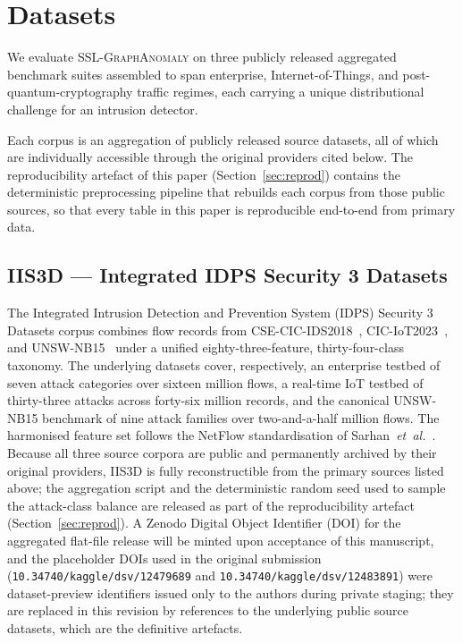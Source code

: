 \documentclass{ieeeaccess}
\begin{document}
\section{Datasets}
\label{sec:datasets}
We evaluate \textsc{SSL-GraphAnomaly} on three publicly released
aggregated benchmark suites assembled to span enterprise, Internet-of-Things,
and post-quantum-cryptography traffic regimes, each carrying a unique
distributional challenge for an intrusion detector.

Each corpus is an aggregation of publicly released source datasets, all
of which are individually accessible through the original providers cited
below. The reproducibility artefact of this paper (Section~\ref{sec:reprod})
contains the deterministic preprocessing pipeline that rebuilds each
corpus from those public sources, so that every table in this paper is
reproducible end-to-end from primary data.

\subsection{IIS3D --- Integrated IDPS Security 3 Datasets}
The Integrated Intrusion Detection and Prevention System (IDPS) Security 3
Datasets corpus combines flow records from
CSE-CIC-IDS2018~\cite{sharafaldin2018cicids},
CIC-IoT2023~\cite{neto2023ciciot}, and UNSW-NB15~\cite{moustafa2015unswnb15}
under a unified eighty-three-feature, thirty-four-class taxonomy. The
underlying datasets cover, respectively, an enterprise testbed of seven
attack categories over sixteen million flows, a real-time IoT testbed of
thirty-three attacks across forty-six million records, and the canonical
UNSW-NB15 benchmark of nine attack families over two-and-a-half million
flows. The harmonised feature set follows the NetFlow standardisation of
Sarhan~\emph{et~al.}~\cite{sarhan2022standard}. Because all three source
corpora are public and permanently archived by their original providers,
IIS3D is fully reconstructible from the primary sources listed above; the
aggregation script and the deterministic random seed used to sample the
attack-class balance are released as part of the reproducibility artefact
(Section~\ref{sec:reprod}). A Zenodo Digital Object Identifier (DOI) for
the aggregated flat-file release will be minted upon acceptance of this
manuscript, and the placeholder DOIs used in the original submission
(\texttt{10.34740/kaggle/dsv/12479689} and
\texttt{10.34740/kaggle/dsv/12483891}) were dataset-preview
identifiers issued only to the authors during private staging; they are
replaced in this revision by references to the underlying public source
datasets, which are the definitive artefacts.
\end{document}
